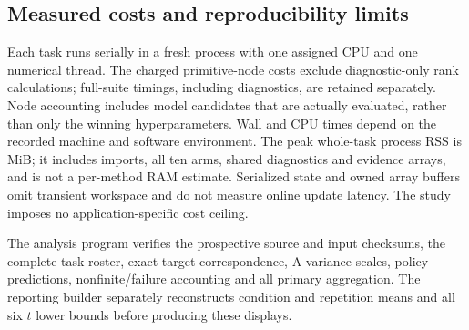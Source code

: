 \begin{table}[!htbp]
\centering\small
\setlength{\tabcolsep}{8pt}
\caption{Whole-procedure choices made by the C-selected non-KAHM policy.
Each task contributes one choice across all horizons after each candidate's
own horizon-wise C mixing selection. Both KAHM arms are excluded. These are
validation choices, not choices made from D errors.}
\label{tab:mechanism-policy}

\end{table}

\subsection{Measured costs and reproducibility limits}

\begin{table}[!htbp]
\centering\small
\setlength{\tabcolsep}{4pt}
\caption{Mean charged resources over all 192 equal-sized task suites.
Fitting and selection include required A fitting, B selection and C calibration.
D prediction covers all 1,664 histories and three horizons. Shared computation
nodes are charged once to every procedure requiring them; policy fitting pays
the union of its non-KAHM candidates, while its prediction/state follow the
selected complete procedure. State denotes serialized selected objects;
arrays count their owned NumPy buffers. These are measured implementation
costs, not minimum deployment complexity.}
\label{tab:mechanism-resources}

\end{table}

Each task runs serially in a fresh process with one assigned CPU and one
numerical thread. The charged primitive-node costs exclude diagnostic-only
rank calculations; full-suite timings, including diagnostics, are retained
separately. Node accounting includes model candidates that are actually
evaluated, rather than only the winning hyperparameters. Wall and CPU times
depend on the recorded machine and software environment. The peak whole-task
process RSS is \RMPeakProcessMiB{} MiB; it includes imports, all ten arms,
shared diagnostics and evidence arrays, and is not a per-method RAM estimate.
Serialized state and owned array buffers omit transient workspace and do not
measure online update latency. The study imposes no application-specific cost ceiling.

The analysis program verifies the prospective source and input checksums,
the complete task roster, exact target correspondence, A variance scales,
policy predictions, nonfinite/failure accounting and all primary aggregation.
The reporting builder separately reconstructs condition and repetition means
and all six $t$ lower bounds before producing these displays.


